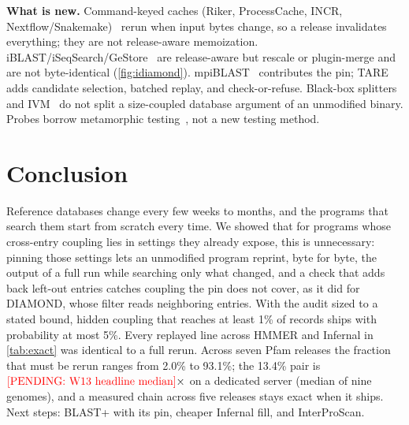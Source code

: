 \documentclass[letterpaper,twocolumn,10pt]{article}
\theoremstyle{definition}
\newcommand{\sys}{TARE\xspace}
\newcommand{\sys}{PARE\xspace}
\begin{document}
\textbf{What is new.} Command\nobreakdash-keyed caches (Riker, ProcessCache, INCR, Nextflow/Snakemake)~\cite{curtsinger2022riker,shiptoski2023processcache,xie2026incr,ditommaso2017nextflow,molder2021snakemake}
rerun when input bytes change, so a release invalidates everything; they are not release\nobreakdash-aware memoization.
iBLAST/iSeqSearch/GeStore~\cite{dash2021iblast,yoo2025iseqsearch,pedersen2014gestore} are release\nobreakdash-aware but rescale or
plugin\nobreakdash-merge and are not byte\nobreakdash-identical (\cref{fig:idiamond}). mpiBLAST~\cite{darling2003mpiblast} contributes the pin;
\sys adds candidate selection, batched replay, and check\nobreakdash-or\nobreakdash-refuse. Black\nobreakdash-box splitters and IVM~\cite{shen2022kumquat,vasilakis2021pash,lamprou2025caruca,blakeley1986views,acar2003selective}
do not split a size\nobreakdash-coupled database argument of an unmodified binary. Probes borrow metamorphic testing~\cite{chen1998metamorphic,segura2016survey}, not a new testing method.

\section{Conclusion}
\label{sec:conclusion}

Reference databases change every few weeks to months, and the programs that search them start from scratch every time. We
showed that for programs whose cross\nobreakdash-entry coupling lies in settings they already expose, this is unnecessary: pinning
those settings lets an unmodified program reprint, byte for byte, the output of a full run while searching only what
changed, and a check that adds back left\nobreakdash-out entries catches coupling the pin does not cover, as it did for DIAMOND,
whose filter reads neighboring entries. With the audit sized to a stated bound, hidden coupling that reaches at least 1\% of records ships with probability at most 5\%. Every replayed line across HMMER and Infernal in \cref{tab:exact} was identical to a full rerun. Across seven Pfam releases the fraction that must be rerun ranges from 2.0\% to 93.1\%; the 13.4\% pair is $\textcolor{red}{\mbox{[PENDING: W13 headline median]}}\times$ on a dedicated server (median of nine genomes), and a measured chain across five releases stays exact when it ships. Next steps: BLAST+ with its pin, cheaper Infernal fill, and InterProScan.
\end{document}
